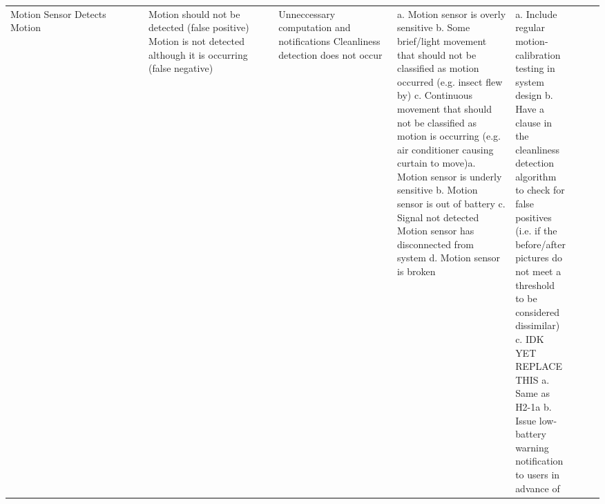 \documentclass{article}
\begin{document}
\begin{table}[H]
\begin{adjustbox}{width=\textwidth}
\begin{tabular}{|p{0.27\linewidth} | p{0.25\linewidth} | p{0.22\linewidth}|  p{0.22\linewidth}|  p{0.30\linewidth}|  p{0.07\linewidth}|  p{0.07\linewidth}|p{0.12\linewidth}| }
         Motion Sensor Detects Motion  & Motion should not be detected (false positive) \newline\newline\newline\newline\newline\newline\newline\newline\newline\newline\newline\newline\newline\newline Motion is not detected although it is occurring (false negative) & Unneccessary computation and notifications \newline\newline\newline\newline\newline\newline\newline\newline\newline\newline\newline\newline\newline\newline Cleanliness detection does not occur & a. Motion sensor is overly sensitive \newline b. Some brief/light movement that should not be classified as motion occurred (e.g. insect flew by) \newline c. Continuous movement that should not be classified as motion is occurring (e.g. air conditioner causing curtain to move)\newline\newline a. Motion sensor is underly sensitive \newline b. Motion sensor is out of battery \newline c. Signal not detected Motion sensor has disconnected from system \newline d. Motion sensor is broken & a. Include regular motion-calibration testing in system design \newline b. Have a clause in the cleanliness detection algorithm to check for false positives (i.e. if the before/after pictures do not meet a threshold to be considered dissimilar) \newline c. IDK YET REPLACE THIS \newline\newline\newline\newline\newline a. Same as H2-1a \newline b. Issue low-battery warning notification to users in advance of 
\end{tabular}
\end{adjustbox}
\end{table}
\end{document}
